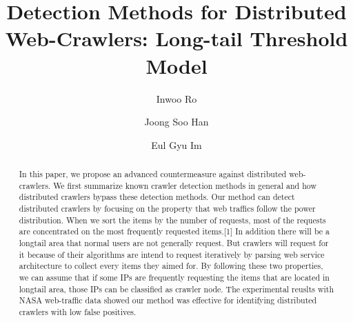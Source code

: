 \documentclass[sigconf,anonymous=true]{acmart}
\begin{document}
\title{Detection Methods for Distributed Web-Crawlers: Long-tail Threshold Model}

\author{Inwoo Ro}

\author{Joong Soo Han}

\author{Eul Gyu Im}



\begin{abstract}
In this paper, we propose an advanced countermeasure against distributed web-crawlers. We first summarize known crawler detection methods in general and how distributed crawlers bypass these detection methods. Our method can detect distributed crawlers by focusing on the property that web traffics follow the power distribution. When we sort the items by the number of requests, most of the requests are concentrated on the most frequently requested items.[1] In addition there will be a longtail area that normal users are not generally request. But crawlers will request for it because of their algorithms are intend to request iteratively by parsing web service architecture to collect every items they aimed for. By following these two properties, we can assume that if some IPs are frequently requesting the items that are located in longtail area, those IPs can be classified as crawler node. The experimental reuslts with NASA web-traffic data showed our method was effective for identifying distributed crawlers with low false positives.
\end{abstract}



\maketitle
\end{document}

